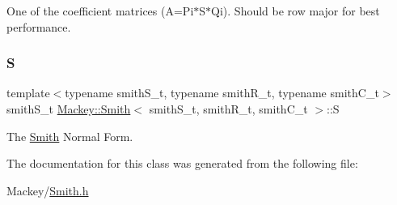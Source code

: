 One of the coefficient matrices (A=Pi$\ast$\+S$\ast$\+Qi). Should be row major for best performance. 

\mbox{\label{classMackey_1_1Smith_a676606c4002b08a37f0ea11dc3686dbe}} 
\subsubsection{\texorpdfstring{S}{S}}
{\footnotesize\ttfamily template$<$typename smith\+S\+\_\+t, typename smith\+R\+\_\+t, typename smith\+C\+\_\+t$>$ \\
smith\+S\+\_\+t \hyperlink{classMackey_1_1Smith}{Mackey\+::\+Smith}$<$ smith\+S\+\_\+t, smith\+R\+\_\+t, smith\+C\+\_\+t $>$\+::S}



The \hyperlink{classMackey_1_1Smith}{Smith} Normal Form. 



The documentation for this class was generated from the following file\+:\begin{DoxyCompactItemize}
\item 
Mackey/\hyperlink{Smith_8h}{Smith.\+h}\end{DoxyCompactItemize}
